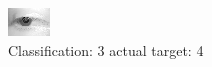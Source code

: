 \begin{figure}[h!]
\begin{center}
\includegraphics[width=0.60\columnwidth]{figures/ID2681_class_3_target_4.png}
\end{center}
\caption{ Classification: 3 actual target: 4}
\label{fig:ID2681_class_3_target_4}
\end{figure}
